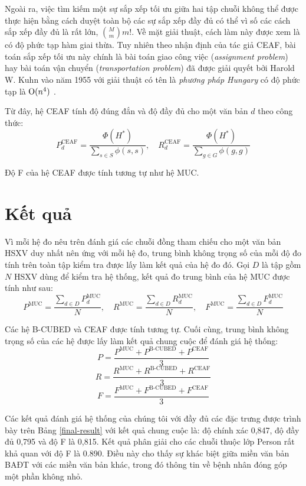 Ngoài ra, việc tìm kiếm một sự sắp xếp tối ưu giữa hai tập chuỗi không thể được thực hiện bằng cách duyệt toàn bộ các sự sắp xếp đầy đủ có thể vì số các cách sắp xếp đầy đủ là rất lớn, $\binom{M}{m}m!$. Về mặt giải thuật, cách làm này được xem là có độ phức tạp hàm giai thừa. Tuy nhiên theo nhận định của tác giả CEAF, bài toán sắp xếp tối ưu này chính là bài toán giao công việc (\emph{assignment problem}) hay bài toán vận chuyển (\emph{transportation problem}) đã được giải quyết bởi Harold W. Kuhn vào năm 1955 với giải thuật có tên là \emph{phương pháp Hungary} có độ phức tạp là $\operatorname{O}(n^4)$ \cite{HungarianMethod}.

Từ đây, hệ CEAF tính độ đúng đắn và độ đầy đủ cho một văn bản $d$ theo công thức:
\[P_d^{\text{CEAF}}=\frac{\Phi(H^*)}{\sum_{s\in S} \phi(s,s)},\quad R_d^{\text{CEAF}}=\frac{\Phi(H^*)}{\sum_{g\in G} \phi(g,g)}\]

Độ F của hệ CEAF được tính tương tự như hệ MUC.

\section{Kết quả}
Vì mỗi hệ đo nêu trên đánh giá các chuỗi đồng tham chiếu cho một văn bản HSXV duy nhất nên ứng với mỗi hệ đo, trung bình không trọng số của mỗi độ đo tính trên toàn tập kiểm tra được lấy làm kết quả của hệ đo đó. Gọi $D$ là tập gồm $N$ HSXV dùng để kiểm tra hệ thống, kết quả đo trung bình của hệ MUC được tính như sau:
\[P^{\text{MUC}}=\frac{\sum_{d\in D}P_d^{\text{MUC}}}{N},\quad R^{\text{MUC}}=\frac{\sum_{d\in D}R_d^{\text{MUC}}}{N},\quad F^{\text{MUC}}=\frac{\sum_{d\in D}F_d^{\text{MUC}}}{N}\]

Các hệ B-CUBED và CEAF được tính tương tự. Cuối cùng, trung bình không trọng số của các hệ được lấy làm kết quả chung cuộc để đánh giá hệ thống:
\[P=\frac{P^{\text{MUC}}+P^{\text{B-CUBED}}+P^{\text{CEAF}}}{3}\]
\[R=\frac{R^{\text{MUC}}+R^{\text{B-CUBED}}+R^{\text{CEAF}}}{3}\]
\[F=\frac{F^{\text{MUC}}+F^{\text{B-CUBED}}+F^{\text{CEAF}}}{3}\]

Các kết quả đánh giá hệ thống của chúng tôi với đầy đủ các đặc trưng được trình bày trên Bảng \ref{final-result} với kết quả chung cuộc là: độ chính xác 0,847, độ đầy đủ 0,795 và độ F là 0,815. Kết quả phân giải cho các chuỗi thuộc lớp Person rất khả quan với độ F là 0.890. Điều này cho thấy sự khác biệt giữa miền văn bản BAĐT với các miền văn bản khác, trong đó thông tin về bệnh nhân đóng góp một phần không nhỏ.

